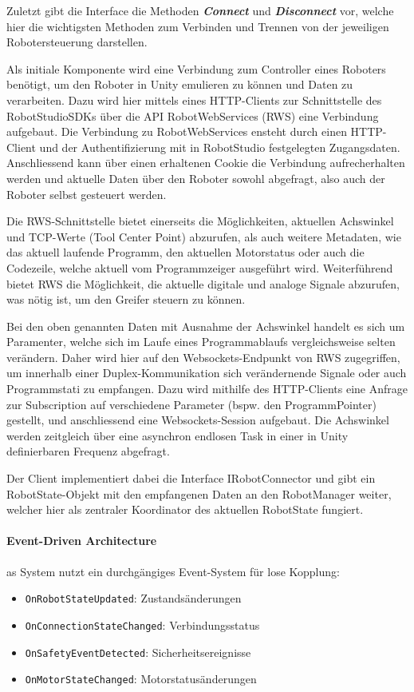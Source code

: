 \noindent
Zuletzt gibt die Interface die Methoden \textit{\textbf{Connect}} und \textit{\textbf{Disconnect}}
vor, welche hier die wichtigsten Methoden zum Verbinden und
Trennen von der jeweiligen Robotersteuerung darstellen.

Als initiale Komponente wird eine Verbindung zum
Controller eines Roboters benötigt, um den Roboter in Unity emulieren zu können
und Daten zu verarbeiten. Dazu wird hier mittels eines HTTP-Clients zur
Schnittstelle des RobotStudioSDKs über die API RobotWebServices (RWS) eine
Verbindung aufgebaut. Die Verbindung zu RobotWebServices ensteht durch einen
HTTP-Client und der Authentifizierung mit in RobotStudio festgelegten
Zugangsdaten. Anschliessend kann über einen erhaltenen Cookie die Verbindung
aufrecherhalten werden und aktuelle Daten über den Roboter sowohl abgefragt,
also auch der Roboter selbst gesteuert werden.

Die RWS-Schnittstelle bietet einerseits die Möglichkeiten,
aktuellen Achswinkel und TCP-Werte (Tool Center Point) abzurufen, als auch
weitere Metadaten, wie das aktuell laufende Programm, den aktuellen Motorstatus
oder auch die Codezeile, welche aktuell vom Programmzeiger ausgeführt wird.
Weiterführend bietet RWS die Möglichkeit, die aktuelle digitale und analoge
Signale abzurufen, was nötig ist, um den Greifer steuern zu können.

Bei den oben genannten Daten mit Ausnahme der Achswinkel handelt es sich um
Paramenter, welche sich im Laufe eines Programmablaufs vergleichsweise selten
verändern. Daher wird hier auf den Websockets-Endpunkt von RWS zugegriffen, um
innerhalb einer Duplex-Kommunikation sich verändernende Signale oder auch
Programmstati zu empfangen. Dazu wird mithilfe des HTTP-Clients eine Anfrage zur
Subscription auf verschiedene Parameter (bspw. den ProgrammPointer) gestellt,
und anschliessend eine Websockets-Session aufgebaut. Die Achswinkel werden
zeitgleich über eine asynchron endlosen Task in einer in Unity definierbaren
Frequenz abgefragt.

Der Client implementiert dabei die Interface IRobotConnector und gibt ein
RobotState-Objekt mit den empfangenen Daten an den RobotManager weiter, welcher hier
als zentraler Koordinator des aktuellen RobotState fungiert.

\noindent
\paragraph{Event-Driven Architecture}
as System nutzt ein durchgängiges Event-System für lose Kopplung:
\begin{itemize}
	\item \texttt{OnRobotStateUpdated}: Zustandsänderungen
	\item \texttt{OnConnectionStateChanged}: Verbindungsstatus
	\item \texttt{OnSafetyEventDetected}: Sicherheitsereignisse
	\item \texttt{OnMotorStateChanged}: Motorstatusänderungen
\end{itemize}

